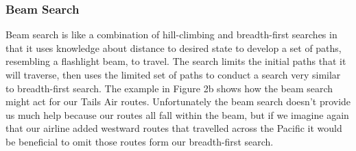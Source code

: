 \subsubsection{Beam Search}
Beam search is like a combination of hill-climbing and breadth-first searches in
that it uses knowledge about distance to desired state to develop a set of
paths, resembling a flashlight beam, to travel.  The search limits the
initial paths that it will traverse, then uses the limited set of paths to
conduct a search very similar to breadth-first search.  The example in Figure 2b
shows how the beam search might act for our Tails Air routes.  Unfortunately the
beam search doesn't provide us much help because our routes all fall within the
beam, but if we imagine again that our airline added westward routes that
travelled across the Pacific it would be beneficial to omit those routes form
our breadth-first search.
